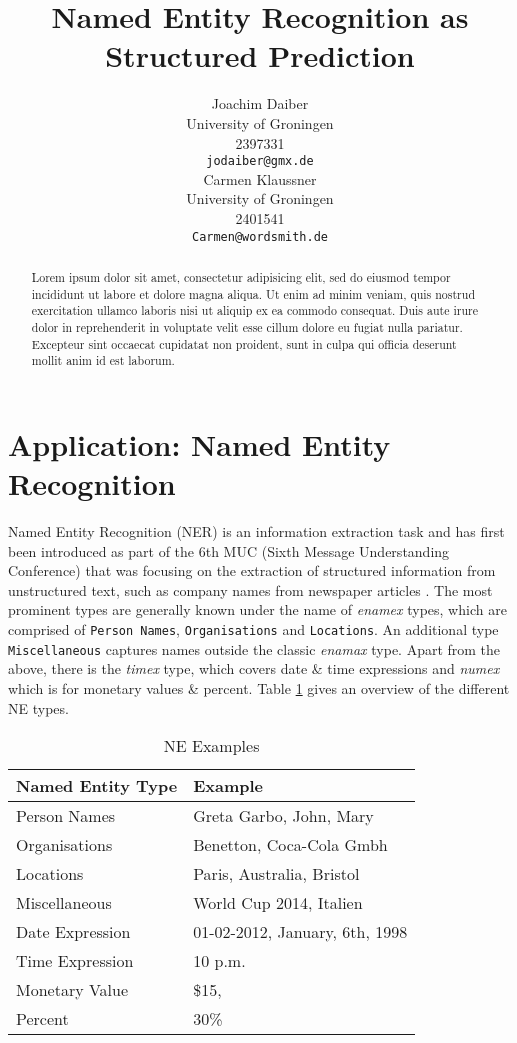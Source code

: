 \documentclass[11pt]{article}
\title{Named Entity Recognition as Structured Prediction}
\author{Joachim Daiber \\
  University of Groningen \\
  2397331\\
  {\tt jodaiber@gmx.de} \\\And
  Carmen Klaussner \\
  University of Groningen \\
  2401541\\
  {\tt Carmen@wordsmith.de} \\}
\date{}
\begin{document}
\maketitle

\begin{abstract}
Lorem ipsum dolor sit amet, consectetur adipisicing elit, sed do eiusmod tempor incididunt ut labore et dolore magna aliqua. Ut enim ad minim veniam, quis nostrud exercitation ullamco laboris nisi ut aliquip ex ea commodo consequat. Duis aute irure dolor in reprehenderit in voluptate velit esse cillum dolore eu fugiat nulla pariatur. Excepteur sint occaecat cupidatat non proident, sunt in culpa qui officia deserunt mollit anim id est laborum.
\end{abstract}


\section{Application: Named Entity Recognition}

Named Entity Recognition (NER) is an information extraction task and has first been introduced as part of the 6th MUC (Sixth Message Understanding Conference)
that was focusing on the extraction of structured information from unstructured text, such as company names from newspaper articles \cite{nadeau2007survey}.
The most prominent types are generally known under the name of \emph{enamex} types, which are comprised of \texttt{Person Names}, 
\texttt{Organisations} and \texttt{Locations}. 
An additional type \texttt{Miscellaneous} captures names outside the classic \emph{enamax} type.
Apart from the above, there is the \emph{timex} type, which covers date \& time expressions and \emph{numex} which is for monetary values \& percent. 
Table \ref{table:NETypes} gives an overview of the different NE types.

\begin{table}[h!]
\scriptsize
\begin{tabular}{| l | l |}
\hline
\bf Named Entity Type & \bf Example \\
\hline
Person Names & Greta Garbo, John, Mary \\
Organisations& Benetton, Coca-Cola Gmbh\\
Locations&  Paris, Australia, Bristol\\
Miscellaneous& World Cup 2014, Italien\\
 Date Expression& 01-02-2012, January, 6th, 1998 \\
Time Expression & 10 p.m.\\
Monetary Value &  \$15, \textsterling 100    \\
Percent &   30\% \\
\hline
\end{tabular}
\caption{NE Examples}
\label{table:NETypes}
\end{table}
\end{document}
